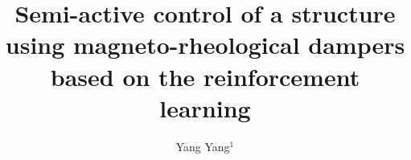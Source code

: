 %
%
%
%
%

%
\RequirePackage{fix-cm}
%
\documentclass{svjour3}                     %
%
\smartqed  %
%
\usepackage{graphicx}
\usepackage{natbib}
\renewcommand{\figurename}{Fig.}
\newcommand{\reffig}[1]{Fig. \ref{#1}}
\usepackage{graphicx}
\usepackage{amsmath,amsfonts}
\usepackage{multirow,booktabs}
\usepackage{subfigure}
\usepackage{setspace}
\usepackage{lineno}
\usepackage{color}


%
%
%
%


%


\title{Semi-active control of a structure using magneto-rheological dampers based on the reinforcement learning
}


\author{Yang Yang$^1$
}

